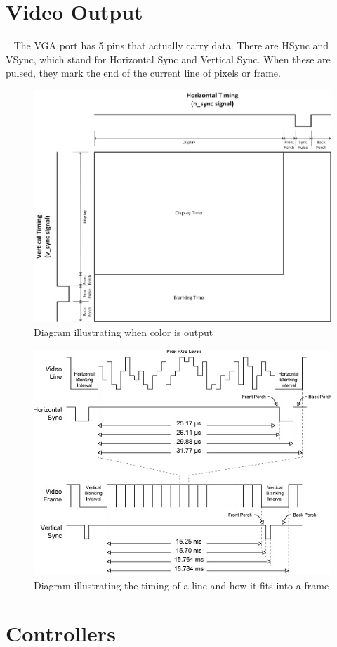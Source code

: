\documentclass[]{article}
\begin{document}
\section{Video Output}\
\label{vidoutput}
The VGA port has 5 pins that actually carry data.  There are HSync and VSync, which stand for Horizontal Sync and Vertical Sync.  When these are pulsed, they mark the end of the current line of pixels or frame.
\begin{figure}[H]\centering
    \includegraphics[width=0.75\linewidth]{figures/VGA_Frame_Diagram.jpg}
    \caption{Diagram illustrating when color is output} 
    \label{fig:vgaFrameFigure}
\end{figure}
\begin{figure}[H]\centering
    \includegraphics[width=0.75\linewidth]{figures/VGA_Timing_Diagram.jpg}
    \caption{Diagram illustrating the timing of a line and how it fits into a frame} 
    \label{fig:vgaTimingFigure}
\end{figure}

\section{Controllers}
\end{document}
